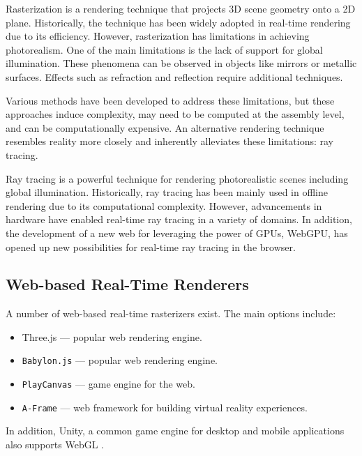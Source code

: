 Rasterization is a rendering technique that projects 3D scene geometry onto a 2D plane. Historically, the technique has been widely adopted in real-time rendering due to its efficiency. However, rasterization has limitations in achieving photorealism. One of the main limitations is the lack of support for global illumination. These phenomena can be observed in objects like mirrors or metallic surfaces. Effects such as refraction and reflection require additional techniques.

Various methods have been developed to address these limitations, but these approaches induce complexity, may need to be computed at the assembly level, and can be computationally expensive. An alternative rendering technique resembles reality more closely and inherently alleviates these limitations: ray tracing.

Ray tracing is a powerful technique for rendering photorealistic scenes including global illumination. Historically, ray tracing has been mainly used in offline rendering due to its computational complexity. However, advancements in hardware have enabled real-time ray tracing in a variety of domains. In addition, the development of a new web  for leveraging the power of \glspl{GPU}, WebGPU, has opened up new possibilities for real-time ray tracing in the browser.

\subsection*{Web-based Real-Time Renderers}

A number of web-based real-time rasterizers exist. The main options include:

\begin{itemize}
  \item {\gls{Three.js}} \cite{threeJSWebsite} — popular web rendering engine.
  \item {\texttt{Babylon.js}} \cite{babylonJSWebsite} — popular web rendering engine.
  \item {\texttt{PlayCanvas}} \cite{playCanvasWebsite} — game engine for the web.
  \item {\texttt{A-Frame}} \cite{aFrameWebsite} — web framework for building virtual reality experiences.
\end{itemize}

In addition, \gls{Unity}, a common game engine for desktop and mobile applications also supports WebGL \cite{unityWebGLCompatibility}.

